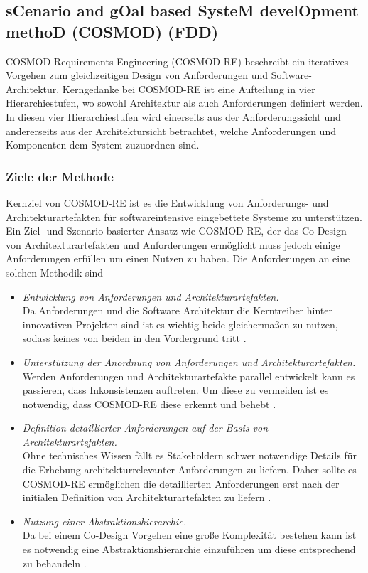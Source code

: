 \subsection{sCenario and gOal based SysteM develOpment methoD (COSMOD) (FDD)}\label{scgo}
COSMOD-Requirements Engineering (COSMOD-RE) beschreibt ein iteratives Vorgehen zum gleichzeitigen Design von Anforderungen und Software-Architektur. Kerngedanke bei COSMOD-RE ist eine Aufteilung in vier Hierarchiestufen, wo sowohl Architektur als auch Anforderungen definiert werden. In diesen vier Hierarchiestufen wird einerseits aus der Anforderungssicht und andererseits aus der Architektursicht betrachtet, welche Anforderungen und Komponenten dem System zuzuordnen sind.\\

\subsubsection{Ziele der Methode}
Kernziel von COSMOD-RE ist es die Entwicklung von Anforderungs- und Architekturartefakten f\"ur softwareintensive eingebettete Systeme zu unterst\"utzen. Ein Ziel- und Szenario-basierter Ansatz wie COSMOD-RE, der das Co-Design von Architekturartefakten und Anforderungen erm\"oglicht muss jedoch einige Anforderungen erf\"ullen um einen Nutzen zu haben. Die Anforderungen an eine solchen Methodik sind \cite{Poh02}\\
 
\begin{itemize}
\item \emph{Entwicklung von Anforderungen und Architekturartefakten.} \\
Da Anforderungen und die Software Architektur die Kerntreiber hinter innovativen Projekten sind ist es wichtig beide gleicherma\ss{}en zu nutzen, sodass keines von beiden in den Vordergrund tritt \cite{Poh02}.
\item \emph{Unterst\"utzung der Anordnung von Anforderungen und Architekturartefakten.} \\
Werden Anforderungen und Architekturartefakte parallel entwickelt kann es passieren, dass Inkonsistenzen auftreten. Um diese zu vermeiden ist es notwendig, dass COSMOD-RE diese erkennt und behebt \cite{Poh02}.
\item \emph{Definition detaillierter Anforderungen auf der Basis von Architekturartefakten.} \\
Ohne technisches Wissen f\"allt es Stakeholdern schwer notwendige Details f\"ur die Erhebung architekturrelevanter Anforderungen zu liefern. Daher sollte es COSMOD-RE erm\"oglichen die detaillierten Anforderungen erst nach der initialen Definition von Architekturartefakten zu liefern \cite{Poh02}. 
\item \emph{Nutzung einer Abstraktionshierarchie.} \\
Da bei einem Co-Design Vorgehen eine gro\ss{}e Komplexit\"at bestehen kann ist es notwendig eine Abstraktionshierarchie einzuf\"uhren um diese entsprechend zu behandeln \cite{Poh02}.\\
\end{itemize}

